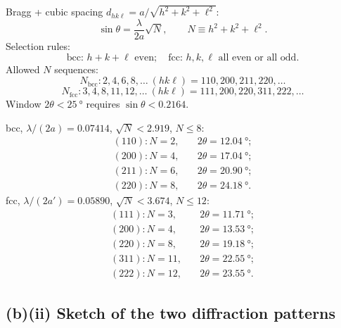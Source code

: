 \documentclass[11pt]{article}
\begin{document}
Bragg + cubic spacing $d_{hk\ell}=a/\sqrt{h^2+k^2+\ell^2}$:
\begin{equation}
\sin\theta = \frac{\lambda}{2a}\sqrt{N},\qquad N\equiv h^2+k^2+\ell^2.
\label{eq:braggcubic}
\end{equation}
Selection rules:
\begin{equation}
\boxed{\ \text{bcc: }h+k+\ell\text{ even};\quad \text{fcc: }h,k,\ell\text{ all even or all odd.}\ }
\label{eq:selrules}
\end{equation}
Allowed $N$ sequences:
\[
N_{\mathrm{bcc}}: 2,4,6,8,\dots\ (hk\ell)=110,200,211,220,\dots
\]
\[
N_{\mathrm{fcc}}: 3,4,8,11,12,\dots\ (hk\ell)=111,200,220,311,222,\dots
\]
Window $2\theta<\SI{25}{\degree}$ requires $\sin\theta<0.2164$.

bcc, $\lambda/(2a)=0.07414$, $\sqrt N<2.919$, $N\le 8$:
\begin{equation}
\begin{aligned}
(110): N=2,&\quad 2\theta=\SI{12.04}{\degree};\\
(200): N=4,&\quad 2\theta=\SI{17.04}{\degree};\\
(211): N=6,&\quad 2\theta=\SI{20.90}{\degree};\\
(220): N=8,&\quad 2\theta=\SI{24.18}{\degree}.
\end{aligned}
\label{eq:bccpeaks}
\end{equation}
fcc, $\lambda/(2a')=0.05890$, $\sqrt N<3.674$, $N\le 12$:
\begin{equation}
\begin{aligned}
(111): N=3,&\quad 2\theta=\SI{11.71}{\degree};\\
(200): N=4,&\quad 2\theta=\SI{13.53}{\degree};\\
(220): N=8,&\quad 2\theta=\SI{19.18}{\degree};\\
(311): N=11,&\quad 2\theta=\SI{22.55}{\degree};\\
(222): N=12,&\quad 2\theta=\SI{23.55}{\degree}.
\end{aligned}
\label{eq:fccpeaks}
\end{equation}

\subsection*{(b)(ii) Sketch of the two diffraction patterns}

\begin{center}
\end{center}
\end{document}
